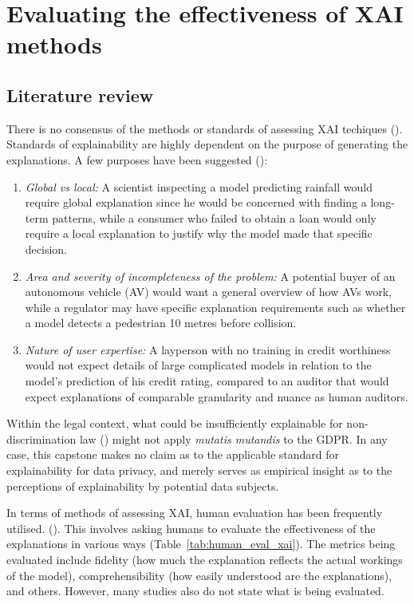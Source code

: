 \section{Evaluating the effectiveness of XAI methods}
\subsection{Literature review}
There is no consensus of the methods or standards of assessing XAI techiques (\cite{vilone2021}). Standards of explainability are highly dependent on the purpose of generating the explanations. A few purposes have been suggested (\cite{doshi-velez2017}):
\begin{enumerate}
	\item \textit{Global vs local:} A scientist inspecting a model predicting rainfall would require global explanation since he would be concerned with finding a long-term patterns, while a consumer who failed to obtain a loan would only require a local explanation to justify why the model made that specific decision.
	\item \textit{Area and severity of incompleteness of the problem:} A potential buyer of an autonomous vehicle (AV) would want a general overview of how AVs work, while a regulator may have specific explanation requirements such as whether a model detects a pedestrian 10 metres before collision.
	\item \textit{Nature of user expertise:} A layperson with no training in credit worthiness would not expect details of large complicated models in relation to the model's prediction of his credit rating, compared to an auditor that would expect explanations of comparable granularity and nuance as human auditors.
\end{enumerate}

Within the legal context, what could be insufficiently explainable for non-discrimination law (\cite{vale2022explainable}) might not apply \textit{mutatis mutandis} to the GDPR. In any case, this capstone makes no claim as to the applicable standard for explainability for data privacy, and merely serves as empirical insight as to the perceptions of explainability by potential data subjects.

In terms of methods of assessing XAI, human evaluation has been frequently utilised. (\cite{danilevsky2020}). This involves asking humans to evaluate the effectiveness of the explanations in various ways (Table~\ref{tab:human_eval_xai}). The metrics being evaluated include fidelity (how much the explanation reflects the actual workings of the model), comprehensibility (how easily understood are the explanations), and others. However, many studies also do not state what is being evaluated. 


